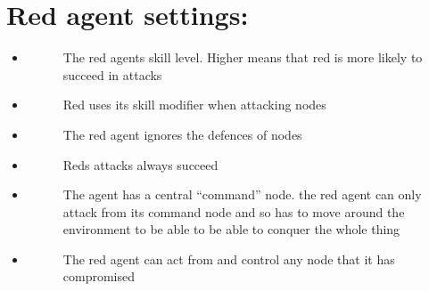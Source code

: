 \documentclass[letterpaper,10pt,english]{sphinxmanual}
\begin{document}
\section{Red agent settings:}
\label{\detokenize{source/config_file:red-agent-settings}}\begin{itemize}
\item {} \begin{description}
\item[{}] \leavevmode
\sphinxAtStartPar
The red agents skill level. Higher means that red is more likely to succeed in attacks

\end{description}

\item {} \begin{description}
\item[{}] \leavevmode
\sphinxAtStartPar
Red uses its skill modifier when attacking nodes

\end{description}

\item {} \begin{description}
\item[{}] \leavevmode
\sphinxAtStartPar
The red agent ignores the defences of nodes

\end{description}

\item {} \begin{description}
\item[{}] \leavevmode
\sphinxAtStartPar
Reds attacks always succeed

\end{description}

\item {} \begin{description}
\item[{}] \leavevmode
\sphinxAtStartPar
The agent has a central “command” node. the red agent can only attack from its command node and so has to move around the environment to be able to be able to conquer the whole thing

\end{description}

\item {} \begin{description}
\item[{}] \leavevmode
\sphinxAtStartPar
The red agent can act from and control any node that it has compromised


\end{description}
\end{itemize}
\end{document}
